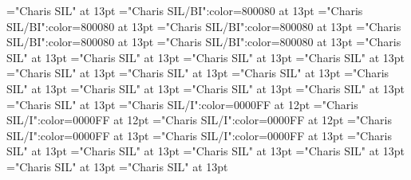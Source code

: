 \documentclass[a4paper]{article}
\begin{document}
\font\sensespanentryletDatadicBody="Charis SIL" at 13pt
\font\grammaticalinfosensespanentryletDatadicBody="Charis SIL/BI":color=800080 at 13pt
\font\grammaticalinfoaftersensespanentryletDatadicBody="Charis SIL/BI":color=800080 at 13pt
\font\partofspeechengrammaticalinfosensespanentryletDatadicBody="Charis SIL/BI":color=800080 at 13pt
\font\spanenpartofspeechengrammaticalinfosensespanentryletDatadicBody="Charis SIL/BI":color=800080 at 13pt
\font\spanengrammaticalinfosensespanentryletDatadicBody="Charis SIL/BI":color=800080 at 13pt
\font{}="Charis SIL" at 13pt
\font\spanendefinitionensensespanentryletDatadicBody="Charis SIL" at 13pt
\font\LexSensepublishStemDefinitionPubensensespanentryletDatadicBody="Charis SIL" at 13pt
\font\spanenLexSensepublishStemDefinitionPubensensespanentryletDatadicBody="Charis SIL" at 13pt
\font\LexSensepublishStemGlossPubLcensensespanentryletDatadicBody="Charis SIL" at 13pt
\font\xitemenLexSensepublishStemGlossPubLcensensespanentryletDatadicBody="Charis SIL" at 13pt
\font\spanenxitemenLexSensepublishStemGlossPubLcensensespanentryletDatadicBody="Charis SIL" at 13pt
\font\xitemhiLexSensepublishStemGlossPubLcensensespanentryletDatadicBody="Charis SIL" at 13pt
\font\spanhixitemhiLexSensepublishStemGlossPubLcensensespanentryletDatadicBody="Charis SIL" at 13pt
\font\xitemteLexSensepublishStemGlossPubLcensensespanentryletDatadicBody="Charis SIL" at 13pt
\font\spantexitemteLexSensepublishStemGlossPubLcensensespanentryletDatadicBody="Charis SIL" at 13pt
\font\spansensespanentryletDatadicBody="Charis SIL" at 13pt
\font\exampleggoTeluINspansensespanentryletDatadicBody="Charis SIL/I":color=0000FF at 12pt
\font\examplebeforespansensespanentryletDatadicBody="Charis SIL/I":color=0000FF at 12pt
\font\exampleafterspansensespanentryletDatadicBody="Charis SIL/I":color=0000FF at 12pt
\font\spanggoTeluINexampleggoTeluINspansensespanentryletDatadicBody="Charis SIL/I":color=0000FF at 13pt
\font\spanenexampleggoTeluINspansensespanentryletDatadicBody="Charis SIL/I":color=0000FF at 13pt
\font\spanspansensespanentryletDatadicBody="Charis SIL" at 13pt
\font\spanspanspansensespanentryletDatadicBody="Charis SIL" at 13pt
\font\CmPossibilitypublishStemTransTypeAbbreviationPubenspanspanspansensespanentryletDatadicBody="Charis SIL" at 13pt
\font\spanenCmPossibilitypublishStemTransTypeAbbreviationPubenspanspanspansensespanentryletDatadicBody="Charis SIL" at 13pt
\font\CmPossibilitypublishStemTransTypeNamePubenspanspanspansensespanentryletDatadicBody="Charis SIL" at 13pt
\font\spanenCmPossibilitypublishStemTransTypeNamePubenspanspanspansensespanentryletDatadicBody="Charis SIL" at 13pt
\end{document}

